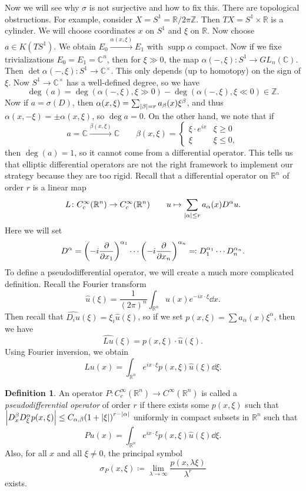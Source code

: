 \documentclass[leqno, openany]{memoir}
\theoremstyle{definition}
\newtheorem{defn}[thm]{Definition}
\theoremstyle{remark}
\theoremstyle{plain}
\theoremstyle{definition}
\theoremstyle{remark}
\newcommand{\R}{\mathbb{R}}
\newcommand{\C}{\mathbb{C}}
\newcommand{\Z}{\mathbb{Z}}
\newcommand{\wh}[1]{\widehat{#1}}
\DeclareMathOperator{\supp}{supp}
\begin{document}
Now we will see why $\sigma$ is not surjective and how to fix this. There are topological obstructions. For example, consider $X = S^1 = \R/2\pi \Z$. Then $TX = S^1 \times \R$ is a cylinder. We will choose coordinates $x$ on $S^1$ and $\xi$ on $\R$. Now choose $a \in K(TS^1)$. We obtain $E_0 \xrightarrow{\alpha(x, \xi)} E_1$ with $\supp \alpha$ compact. Now if we fixe trivializations $E_0 = E_1 = \C^n$, then for $\xi \gg 0$, the map $\alpha(-, \xi) \colon S^1 \to GL_n(\C)$. Then $\det \alpha(-,\xi) \colon S^1 \to \C^{\times}$. This only depends (up to homotopy) on the sign of $\xi$. Now $S^1 \to \C^{\times}$ has a well-defined degree, so we have
\[ \deg(a) = \deg(\alpha(-, \xi), \xi \gg 0) - \deg(\alpha(-,\xi), \xi \ll 0) \in \Z. \]
Now if $a = \sigma(D)$, then $\alpha(x, \xi) = \sum_{\abs{\beta}=r} a_{\beta}(x) \xi^{\beta}$, and thus $\alpha(x, -\xi) = \pm \alpha(x, \xi)$, so $\deg a = 0$. On the other hand, we note that if 
\[ a = \C \xrightarrow{\beta(x, \xi)} \C \qquad \beta(x, \xi) = \begin{cases}
    \xi \cdot e^{ix} & \xi \geq 0 \\
    \xi & \xi \leq 0,
\end{cases} \]
then $\deg(a) = 1$, so it cannot come from a differential operator. This tells us that elliptic differential operators are not the right framework to implement our strategy because they are too rigid. Recall that a differential operator on $\R^n$ of order $r$ is a linear map
\[ L \colon C^{\infty}_c(\R^n) \to C^{\infty}_c(\R^n) \qquad u \mapsto \sum_{\abs{\alpha}\leq r} a_{\alpha}(x) D^{\alpha} u. \]
Here we will set 
\[ D^{\alpha} = {\qty(-i \pdv{x_1})}^{\alpha_1} \cdots {\qty(-i \pdv{x_n})}^{\alpha_n} \eqqcolon D_1^{\alpha_1} \cdots D_n^{\alpha_n}. \]
To define a pseudodifferential operator, we will create a much more complicated definition. Recall the Fourier transform 
\[ \wh{u}(\xi) = \frac{1}{{(2\pi)}^n} \int_{\R^n} u(x) e^{-ix \cdot \xi} \dd{x}. \]
Then recall that $\wh{D_i u}(\xi) = \xi_i \wh{u}(\xi)$, so if we set $p(x, \xi) = \sum a_{\alpha}(x) \xi^{\alpha}$, then we have
\[ \wh{Lu}(\xi) = p(x, \xi) \cdot \wh{u}(\xi). \]
Using Fourier inversion, we obtain
\[ Lu(x) = \int_{\R^n} e^{ix \cdot \xi} p(x, \xi) \wh{u}(\xi) \dd{\xi}. \]

\begin{defn}
    An operator $P \colon C^{\infty}_c(\R^n) \to C^{\infty}(\R^n)$ is called a \textit{pseudodifferential operator} of order $r$ if there exists some $p(x, \xi)$ such that $\abs{D_x^{\beta} D_{\xi}^{\alpha} p(x,\xi)} \leq C_{\alpha, \beta} {(1+\abs{\xi})}^{r-\abs{\alpha}}$ uniformly in compact subsets in $\R^n$ such that
    \[ Pu(x) = \int_{\R^n} e^{ix \cdot \xi} p(x, \xi) \wh{u}(\xi) \dd{\xi}. \]
    Also, for all $x$ and all $\xi \neq 0$, the principal symbol
    \[ \sigma_P(x, \xi) \coloneqq \lim_{\lambda \to \infty} \frac{p(x, \lambda \xi)}{\lambda^r} \]
    exists.
\end{defn}
\end{document}
